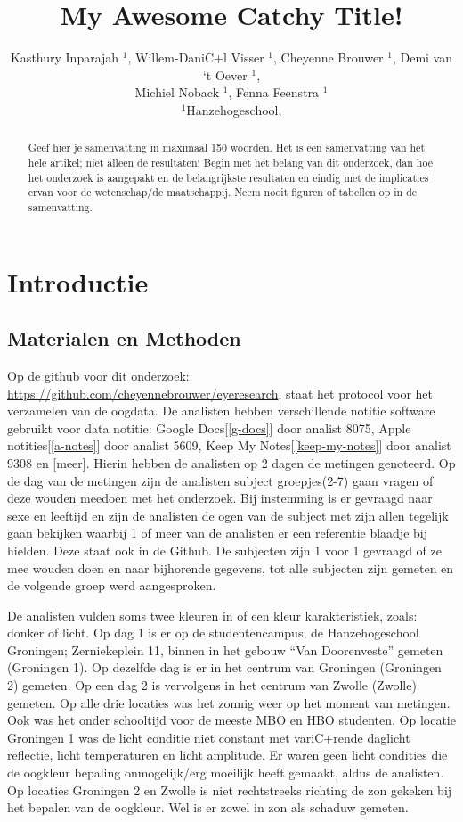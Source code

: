 \documentclass[
]{article}
\title{My Awesome Catchy Title!}
\author{Kasthury Inparajah \(^1\), Willem-DaniC+l Visser \(^1\), Cheyenne Brouwer \(^1\), Demi van `t Oever \(^1\),\\
Michiel Noback \(^1\), Fenna Feenstra \(^1\)\\
\(^1\)Hanzehogeschool,}
\date{}
\begin{document}
\maketitle
\begin{abstract}
Geef hier je samenvatting in maximaal 150 woorden. Het is een samenvatting van het hele artikel; niet alleen de resultaten! Begin met het belang van dit onderzoek, dan hoe het onderzoek is aangepakt en de belangrijkste resultaten en eindig met de implicaties ervan voor de wetenschap/de maatschappij. Neem nooit figuren of tabellen op in de samenvatting.
\end{abstract}

\hypertarget{introductie}{%
\section{Introductie}\label{introductie}}

\hypertarget{materialen-en-methoden}{%
\subsection{Materialen en Methoden}\label{materialen-en-methoden}}

Op de github voor dit onderzoek:
\url{https://github.com/cheyennebrouwer/eyeresearch}, staat het protocol
voor het verzamelen van de oogdata. De analisten hebben verschillende
notitie software gebruikt voor data notitie: Google Docs{[}\ref{g-docs}{]}
door analist 8075, Apple notities{[}\ref{a-notes}{]} door analist 5609,
Keep My Notes{[}\ref{keep-my-notes}{]} door analist 9308 en {[}meer{]}. Hierin
hebben de analisten op 2 dagen de metingen genoteerd. Op de dag van de
metingen zijn de analisten subject groepjes(2-7) gaan vragen of deze
wouden meedoen met het onderzoek. Bij instemming is er gevraagd naar
sexe en leeftijd en zijn de analisten de ogen van de subject met zijn
allen tegelijk gaan bekijken waarbij 1 of meer van de analisten er een
referentie blaadje bij hielden. Deze staat ook in de Github. De
subjecten zijn 1 voor 1 gevraagd of ze mee wouden doen en naar
bijhorende gegevens, tot alle subjecten zijn gemeten en de volgende
groep werd aangesproken.

De analisten vulden soms twee kleuren in of een kleur karakteristiek,
zoals: donker of licht. Op dag 1 is er op de studentencampus, de
Hanzehogeschool Groningen; Zerniekeplein 11, binnen in het gebouw ``Van
Doorenveste'' gemeten (Groningen 1). Op dezelfde dag is er in het centrum
van Groningen (Groningen 2) gemeten. Op een dag 2 is vervolgens in het
centrum van Zwolle (Zwolle) gemeten. Op alle drie locaties was het
zonnig weer op het moment van metingen. Ook was het onder schooltijd
voor de meeste MBO en HBO studenten. Op locatie Groningen 1 was de licht
conditie niet constant met variC+rende daglicht reflectie, licht
temperaturen en licht amplitude. Er waren geen licht condities die de
oogkleur bepaling onmogelijk/erg moeilijk heeft gemaakt, aldus de
analisten. Op locaties Groningen 2 en Zwolle is niet rechtstreeks
richting de zon gekeken bij het bepalen van de oogkleur. Wel is er zowel
in zon als schaduw gemeten.
\end{document}
